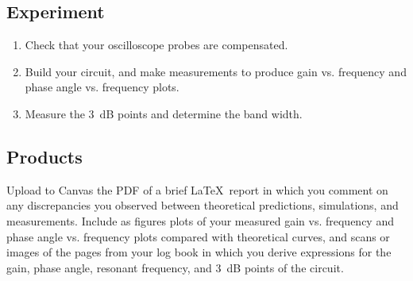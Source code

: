 \documentclass[11pt]{article}
\begin{document}
\subsection*{Experiment}

\begin{enumerate}
\item Check that your oscilloscope probes are compensated.

\item Build your circuit, and make measurements to produce gain
  vs. frequency and phase angle vs. frequency plots.

\item Measure the 3~dB points and determine the band width.
\end{enumerate}

\subsection*{Products}

Upload to Canvas the PDF of a brief \LaTeX\ report in which you
comment on any discrepancies you observed between theoretical
predictions, simulations, and measurements. Include as figures plots
of your measured gain vs. frequency and phase angle vs. frequency
plots compared with theoretical curves, and scans or images of the
pages from your log book in which you derive expressions for the gain,
phase angle, resonant frequency, and 3~dB points of the circuit.
\end{document}
